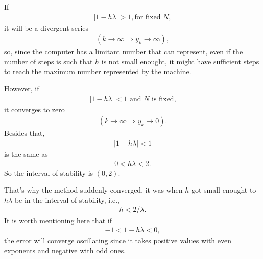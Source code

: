 \documentclass[letterpaper,10pt,english]{jupyterBook}
\begin{document}
\sphinxAtStartPar
If
\begin{equation*}
\begin{split}
|1 - h \lambda| > 1, \text{for fixed } N,
\end{split}
\end{equation*}
\sphinxAtStartPar
it will be a divergent series
\begin{equation*}
\begin{split}
(k \rightarrow \infty \Rightarrow y_k \rightarrow \infty),
\end{split}
\end{equation*}
\sphinxAtStartPar
so, since the computer has a limitant number that can represent, even if the number of steps is such that \(h\) is not small enought, it might have sufficient steps to reach the maximum number represented by the machine.

\sphinxAtStartPar
However, if
\begin{equation*}
\begin{split}
    |1 - h \lambda| < 1 \text{ and } N \text{ is fixed,}
\end{split}
\end{equation*}
\sphinxAtStartPar
it converges to zero
\begin{equation*}
\begin{split}
    (k \rightarrow \infty \Rightarrow y_k \rightarrow 0 ).
\end{split}
\end{equation*}
\sphinxAtStartPar
Besides that,
\begin{equation*}
\begin{split}
|1 - h \lambda| < 1
\end{split}
\end{equation*}
\sphinxAtStartPar
is the same as
\begin{equation*}
\begin{split}
0 < h \lambda < 2.
\end{split}
\end{equation*}
\sphinxAtStartPar
So the interval of stability is \((0,2)\).

\sphinxAtStartPar
That’s why the method suddenly converged, it was when \(h\) got small enought to \(h \lambda\) be in the interval of stability, i.e.,
\begin{equation*}
\begin{split}
    h < 2/\lambda.
\end{split}
\end{equation*}
\sphinxAtStartPar
It is worth mentioning here that if
\begin{equation*}
\begin{split}
-1 < 1 - h \lambda < 0,
\end{split}
\end{equation*}
\sphinxAtStartPar
the error will converge oscillating since it takes positive values with even exponents and negative with odd ones.
\end{document}
